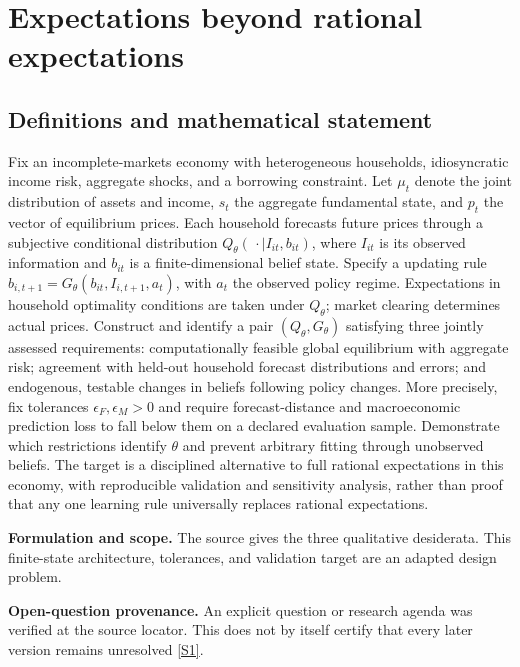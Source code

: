 \documentclass[11pt]{article}
\newcommand{\sref}[2]{\hyperlink{source:#1:#2}{[S#2]}}
\begin{document}
\section*{Expectations beyond rational expectations}\label{30007514}
\subsection{Definitions and mathematical statement}
Fix an incomplete-markets economy with heterogeneous households, idiosyncratic income risk, aggregate shocks, and a borrowing constraint. Let \(\mu_t\) denote the joint distribution of assets and income, \(s_t\) the aggregate fundamental state, and \(p_t\) the vector of equilibrium prices. Each household forecasts future prices through a subjective conditional distribution \(Q_\theta(\,\cdot\mid I_{it},b_{it})\), where \(I_{it}\) is its observed information and \(b_{it}\) is a finite-dimensional belief state. Specify a updating rule \(b_{i,t+1}=G_\theta(b_{it},I_{i,t+1},a_t)\), with \(a_t\) the observed policy regime. Expectations in household optimality conditions are taken under \(Q_\theta\); market clearing determines actual prices.
Construct and identify a pair \((Q_\theta,G_\theta)\) satisfying three jointly assessed requirements: computationally feasible global equilibrium with aggregate risk; agreement with held-out household forecast distributions and errors; and endogenous, testable changes in beliefs following policy changes. More precisely, fix tolerances \(\epsilon_F,\epsilon_M>0\) and require forecast-distance and macroeconomic prediction loss to fall below them on a declared evaluation sample. Demonstrate which restrictions identify \(\theta\) and prevent arbitrary fitting through unobserved beliefs. The target is a disciplined alternative to full rational expectations in this economy, with reproducible validation and sensitivity analysis, rather than proof that any one learning rule universally replaces rational expectations.

\par\textbf{Formulation and scope.} The source gives the three qualitative desiderata. This finite-state architecture, tolerances, and validation target are an adapted design problem.

\par\textbf{Open-question provenance.} An explicit question or research agenda was verified at the source locator. This does not by itself certify that every later version remains unresolved \sref{30007514}{1}.
\end{document}
